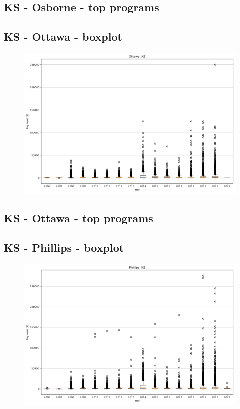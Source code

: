 \subsection*{KS - Osborne - top programs}

\newpage
\subsection*{KS - Ottawa - boxplot}
\begin{figure}[h]
\centering
\includegraphics[width=7in]{../output/boxplots/counties/Ottawa-KS_boxplot.png}
\end{figure}


\subsection*{KS - Ottawa - top programs}

\newpage
\subsection*{KS - Phillips - boxplot}
\begin{figure}[h]
\centering
\includegraphics[width=7in]{../output/boxplots/counties/Phillips-KS_boxplot.png}
\end{figure}


